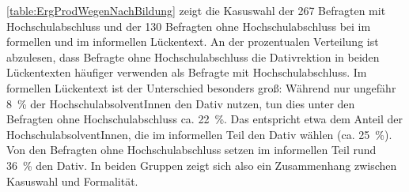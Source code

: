 \autoref{table:ErgProdWegenNachBildung} zeigt die Kasuswahl der 267 Befragten mit Hochschulabschluss und der 130 Befragten ohne Hochschulabschluss bei \wegen{} im formellen und im informellen Lückentext. 
An der prozentualen Verteilung ist abzulesen, dass Befragte ohne Hochschulabschluss die Dativrektion in beiden Lückentexten häufiger verwenden als Befragte mit Hochschulabschluss. 
Im formellen Lückentext ist der Unterschied besonders groß: 
Während nur ungefähr 8~\% der HochschulabsolventInnen den Dativ nutzen, tun dies unter den Befragten ohne Hochschulabschluss ca. 22~\%. 
Das entspricht etwa dem Anteil der HochschulabsolventInnen, die im informellen Teil den Dativ wählen (ca. 25~\%). 
Von den Befragten ohne Hochschulabschluss setzen im informellen Teil rund 36~\% den Dativ. 
In beiden Gruppen zeigt sich also ein Zusammenhang zwischen Kasuswahl und Formalität. 
